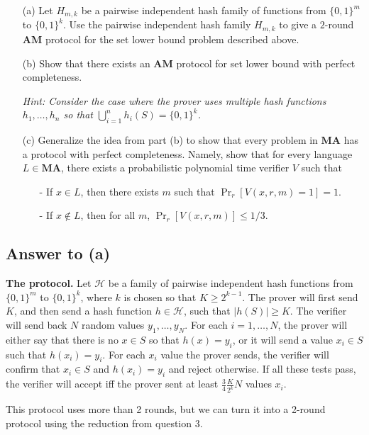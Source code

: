\documentclass{article}
\newcommand{\AM}{\mathbf{AM}}
\newcommand{\MA}{\mathbf{MA}}
\begin{document}
\begin{enumerate}
    \item[(a)] Let $H_{m,k}$ be a pairwise independent hash family of functions from $\{0,1\}^m$ to $\{0,1\}^k$. Use the pairwise independent hash family $H_{m,k}$ to give a $2$-round $\AM$ protocol for the set lower bound problem described above.
    
    \item[(b)] Show that there exists an $\AM$ protocol for set lower bound with perfect completeness.

    \emph{Hint: Consider the case where the prover uses multiple hash functions $h_1,\dots, h_n$ so that $\bigcup_{i = 1}^n h_i(S) = \{0,1\}^k$.}
    
    \item[(c)] Generalize the idea from part (b) to show that every problem in $\MA$ has a protocol with perfect completeness. Namely, show that for every language $L\in \MA$, there exists a probabilistic polynomial time verifier $V$ such that 
    \begin{enumerate}
        \item[-] If $x\in L$, then there exists $m$ such that $\Pr_r[V(x,r,m) = 1] = 1$.
        \item[-] If $x\not\in L$, then for all $m$, $\Pr_r[V(x,r,m)]\le 1/3$.
    \end{enumerate}
\end{enumerate}

\newpage
\subsection*{Answer to (a)}

\textbf{The protocol.}
Let $\mathcal{H}$ be a family of pairwise independent hash functions from $\{0, 1\}^m$ to $\{0, 1\}^k$, where $k$ is chosen so that $K \geq 2^{k - 1}$.
The prover will first send $K$, and then send a hash function $h \in \mathcal{H}$, such that
$|h(S)| \geq K$.
The verifier will send back $N$ random values $y_1, \dots, y_N$.
For each $i = 1, \dots, N$, the prover will either say that there is no $x \in S$ so that $h(x) = y_i$, or it will send a value $x_i \in S$ such that $h(x_i) = y_i$.
For each $x_i$ value the prover sends, the verifier will confirm that $x_i \in S$ and $h(x_i) = y_i$ and reject otherwise.
If all these tests pass, the verifier will accept iff the prover sent at least $\frac{3}{4} \frac{K}{2^k}N$ values $x_i$.

This protocol uses more than 2 rounds, but we can turn it into a 2-round protocol using the reduction from question 3.
\end{document}
